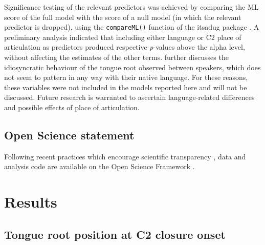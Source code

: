 \documentclass[
  12pt,
]{article}
\begin{document}
Significance testing of the relevant predictors was achieved by
comparing the ML score of the full model with the score of a null model
(in which the relevant predictor is dropped), using the
\texttt{compareML()} function of the itsadug package
\citep{van-rij2017}. A preliminary analysis indicated that including
either language or C2 place of articulation as predictors produced
respective \emph{p}-values above the alpha level, without affecting the
estimates of the other terms.  further discusses the
idiosyncratic behaviour of the tongue root observed between speakers,
which does not seem to pattern in any way with their native language.
For these reasons, these variables were not included in the models
reported here and will not be discussed. Future research is warranted to
ascertain language-related differences and possible effects of place of
articulation.

\hypertarget{open-science-statement}{%
\subsection{Open Science statement}\label{open-science-statement}}

Following recent practices which encourage scientific transparency
\citep{cruwell2018, berez-kroeker2018, roettger2019}, data and analysis
code are available on the Open Science Framework \citep{coretta2019}.

\hypertarget{results}{%
\section{Results}\label{results}}

\label{s:results}

\hypertarget{tongue-root-position-at-c2-closure-onset}{%
\subsection{Tongue root position at C2 closure
onset}\label{tongue-root-position-at-c2-closure-onset}}

\label{s:tra-lm}
\end{document}
